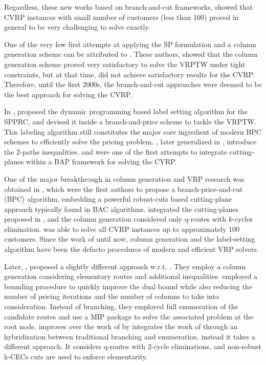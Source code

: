 Regardless, these new works based on branch-and-cut frameworks, showed that CVRP instances
with small number of customers (less than 100) proved in general
to be very challenging to solve exactly.


One of the very few first attempts at applying
the SP formulation and a column generation scheme can
be attributed to \textcite{desrosiers1984, agarwal1989}.
These authors, showed that the column generation scheme proved
very satisfactory to solve the VRPTW under tight constraints,
but at that time, did not achieve satisfactory results for the CVRP.
Therefore, until the first 2000s, the branch-and-cut approaches
were deemed to be the best approach for solving the CVRP.

In \citeyear{desrochers1992}, \citeauthor{desrochers1992}
proposed the dynamic programming based label setting algorithm for the SPPRC,
and devised it inside a branch-and-price scheme to tackle the VRPTW.
This labeling algorithm still constitutes the major core ingredient
of modern BPC schemes to efficiently solve the pricing problem.
\textcite{kohl1999}, later generalized in \cite{desaulniers2008}, introduce the
2-paths inequalities, and were one of the first attempts to integrate
cutting-planes within a BAP framework for solving the CVRP.

One of the major breakthrough in column generation and VRP research
was obtained in \textcite{fukasawa2006}, which were the
first authors to propose a branch-price-and-cut (BPC) algorithm,
embedding a powerful robust-cuts based cutting-plane approach
typically found in BAC algorithms.
\citeauthor{fukasawa2006} integrated the cutting-planes proposed in \cite{lysgaard2004},
and the column generation considered only q-routes with $k$-cycles elimination.
\textcite{fukasawa2006} was able to solve all CVRP instances up to approximately 100 customers.
Since the work of \citeauthor{fukasawa2006} until now, column generation
and the label-setting algorithm have been the defacto procedures
of modern and efficient VRP solvers.

Later, \textcite{baldacci2008}, proposed a slightly different approach w.r.t. \citeauthor{fukasawa2006}.
They employ a column generation considering elementary routes and additional inequalities.
\citeauthor{baldacci2008} employed a bounding procedure to quickly
improve the dual bound while also reducing the number
of pricing iterations and the number of columns to take into consideration.
Instead of branching, they employed full enumeration of the candidate
routes and use a MIP package to solve the associated problem at the root node.
\textcite{pessoa2008} improves over the work of \citeauthor{fukasawa2006}
by integrates the work of \citeauthor{baldacci2008}
through an hybridization between traditional branching and enumeration.
\textcite{contardo2011} instead it takes a different approach.
It considers q-routes with 2-cycle eliminations, and non-robust
k-CECs cuts are used to enforce elementarity.

